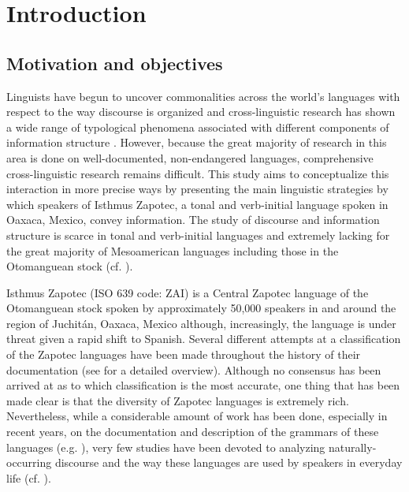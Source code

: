 \chapter{Introduction}

\section{Motivation and objectives}

Linguists have begun to uncover commonalities across the world's languages with respect to the way discourse is organized and cross-linguistic research has shown a wide range of typological phenomena associated with different components of information structure \citep{bernini2006,mereu2009,erteschik2007}. However, because the great majority of research in this area is done on well-documented, non-endangered languages, comprehensive cross-linguistic research remains difficult. This study aims to conceptualize this interaction in more precise ways by presenting the main linguistic strategies by which speakers of Isthmus Zapotec, a tonal and verb-initial language spoken in Oaxaca, Mexico, convey information. The study of discourse and information structure is scarce in tonal and verb-initial languages and extremely lacking for the great majority of Mesoamerican languages including those in the Otomanguean stock (cf. \citealt{camacho2010,lillehaugen2008,lillehaugen2016}). 

Isthmus Zapotec (ISO 639 code: ZAI) is a Central Zapotec language of the Otomanguean stock spoken by approximately 50,000 speakers in and around the region of Juchit\'{a}n, Oaxaca, Mexico although, increasingly, the language is under threat given a rapid shift to Spanish. Several different attempts at a classification of the Zapotec languages have been made throughout the history of their documentation (see \citealt{smithstark2003,campbell2017a,campbell2017b} for a detailed overview). Although no consensus has been arrived at as to which classification is the most accurate, one thing that has been made clear is that the diversity of Zapotec languages is extremely rich. Nevertheless, while a considerable amount of work has been done, especially in recent years, on the documentation and description of the grammars of these languages (e.g. \citealt{avelino2004,beamdeazcona2004,sonnenschein2005}), very few studies have been devoted to analyzing naturally-occurring discourse and the way these languages are used by speakers in everyday life (cf. \citealt{castillo2014}).

